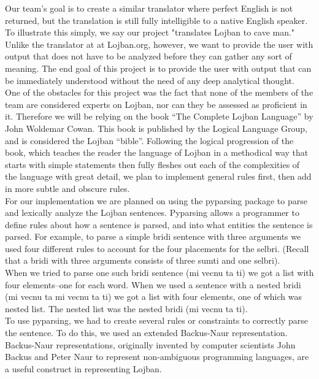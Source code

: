 \documentclass[11pt,letterpaper]{article}
\begin{document}
	Our team’s goal is to create a similar translator where  perfect English is not returned, but the translation is still fully intelligible to a native English speaker. To illustrate this simply, we say our project "translates Lojban to cave man."  Unlike the translator at  at Lojban.org, however, we want to provide the user with output that does not have to be analyzed before they can gather any sort of meaning. The end goal of this project is to provide the user with output that can be immediately understood without the need of any deep analytical thought.\\

	One of the obstacles for this project was the fact that none of the members of the team are considered experts on Lojban, nor can they be assessed as proficient in it. Therefore we will be relying on the book “The Complete Lojban Language” by John Woldemar Cowan. This book is published by the Logical Language Group, and is considered the Lojban “bible”. Following the logical progression of the book, which teaches the reader the language of Lojban in a methodical way that starts with simple statements then fully fleshes out each of the complexities of the language with great detail, we plan to implement general rules first, then add in more subtle and obscure rules. \\

	For our implementation we are planned on using the pyparsing package to parse and lexically analyze the Lojban sentences.  Pyparsing allows a programmer to define rules about how a sentence is parsed, and into what entities the sentence is parsed. For example, to parse a simple  bridi sentence with three arguments we used four different rules to account for the four placements for the selbri. (Recall that a bridi with three arguments consists of three sumti and one selbri). \\

	When we tried to parse one such bridi sentence (mi vecnu ta ti) we got a list with four elements--one for each word. When we used a sentence with a nested bridi (mi vecnu ta mi vecnu ta ti) we got a list with four elements, one of which was nested list. The nested list was the nested bridi (mi vecnu ta ti). \\

	To use pyparsing, we had to create several rules or constraints to correctly parse the sentence. To do this, we used an extended Backus-Naur representation. Backus-Naur representations, originally invented by computer scientists John Backus and Peter Naur to represent non-ambiguous programming languages, are a useful construct in representing Lojban.\\
\end{document}
